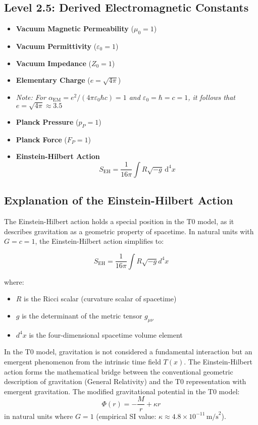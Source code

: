 \documentclass[12pt,a4paper]{article}
\newcommand{\alphaEM}{\alpha_{\text{EM}}}
\begin{document}
	\subsection*{Level 2.5: Derived Electromagnetic Constants}
	\begin{itemize}[itemsep=0.5em]
		\item \textbf{Vacuum Magnetic Permeability} (\(\mu_0 = 1\))
		\item \textbf{Vacuum Permittivity} (\(\varepsilon_0 = 1\))
		\item \textbf{Vacuum Impedance} (\(Z_0 = 1\))
		\item \textbf{Elementary Charge} (\(e = \sqrt{4\pi}\))
		\item[] \textit{Note: For $\alphaEM = e^2/(4\pi\varepsilon_0\hbar c) = 1$ and $\varepsilon_0 = \hbar = c = 1$, it follows that $e = \sqrt{4\pi} \approx 3.5$}
		\item \textbf{Planck Pressure} (\(p_P = 1\))
		\item \textbf{Planck Force} (\(F_P = 1\))
		\item \textbf{Einstein-Hilbert Action}
		\[
		S_{\mathrm{EH}} = \frac{1}{16\pi} \int R \sqrt{-g} \, \mathrm{d}^4x
		\]
	\end{itemize}
	
	\subsection*{Explanation of the Einstein-Hilbert Action}
	
	The Einstein-Hilbert action holds a special position in the T0 model, as it describes gravitation as a geometric property of spacetime. In natural units with $G = c = 1$, the Einstein-Hilbert action simplifies to:
	
	\[
	S_{\mathrm{EH}} = \frac{1}{16\pi}\int R\sqrt{-g}d^4x
	\]
	
	where:
	\begin{itemize}
		\item $R$ is the Ricci scalar (curvature scalar of spacetime)
		\item $g$ is the determinant of the metric tensor $g_{\mu\nu}$
		\item $d^4x$ is the four-dimensional spacetime volume element
	\end{itemize}
	
	In the T0 model, gravitation is not considered a fundamental interaction but an emergent phenomenon from the intrinsic time field $T(x)$. The Einstein-Hilbert action forms the mathematical bridge between the conventional geometric description of gravitation (General Relativity) and the T0 representation with emergent gravitation.
The modified gravitational potential in the T0 model:
\[
\Phi(r) = -\frac{M}{r} + \kappa r
\]
in natural units where \(G = 1\) (empirical SI value: \(\kappa \approx 4.8 \times 10^{-11} \, \text{m/s}^2\)).
\end{document}
